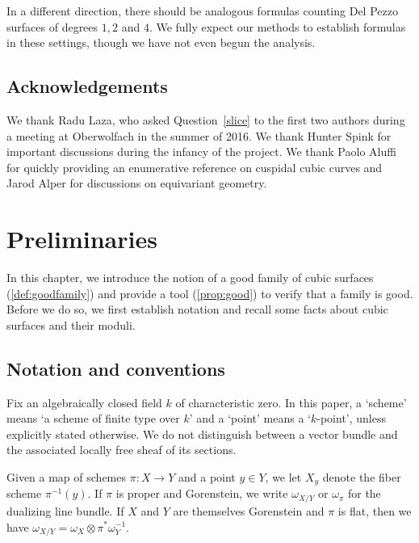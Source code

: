 \documentclass[12pt,reqno]{amsart}
\renewcommand{\k}{k}
\renewcommand{\to}{{\longrightarrow}}
\numberwithin{equation}{section}
\begin{document}
In a different direction, there should be analogous formulas counting
Del Pezzo surfaces of degrees $1,2$ and $4$.  We fully expect our
methods to establish formulas in these settings, though we have not
even begun the analysis.  



\subsection{Acknowledgements}
We thank Radu Laza, who asked Question~\ref{slice} to the first two
authors during a meeting at Oberwolfach in the summer of 2016.  We
thank Hunter Spink for important discussions during the infancy
of the project.  We thank Paolo Aluffi for quickly providing an
enumerative reference on cuspidal cubic curves and Jarod Alper for discussions on equivariant geometry.



  




\section{Preliminaries}
\label{sec:good}

In this chapter, we introduce the notion of a good family of cubic
surfaces (\autoref{def:goodfamily}) and provide a tool
(\autoref{prop:good}) to verify that a family is good.  Before we do
so, we first establish notation and recall some facts about cubic surfaces and their moduli.
\subsection{Notation and conventions}
\label{sec:notation-conventions}
Fix an algebraically closed field $\k$ of characteristic zero.  In
this paper, a `scheme' means `a scheme of finite type over $\k$' and a
`point' means a `$\k$-point', unless explicitly stated otherwise.  We
do not distinguish between a vector bundle and the associated locally
free sheaf of its sections.

Given a map of schemes $\pi \colon X \to Y$ and a point $y \in Y$, we
let $X_y$ denote the fiber scheme $\pi^{-1}(y)$.  If $\pi$ is proper
and Gorenstein, we write $\omega_{X/Y}$ or $\omega_\pi$ for the
dualizing line bundle.  If $X$ and $Y$ are themselves Gorenstein and
$\pi$ is flat, then we have
$\omega_{X/Y} = \omega_X \otimes \pi^*\omega_Y^{-1}$.
\end{document}
